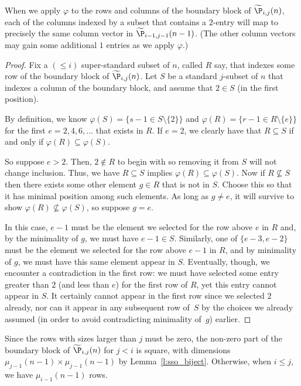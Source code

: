 \begin{lemma}\label{l:ssoequiv}
When we apply $\varphi$ to the rows and columns of the boundary block of $\widetilde\P_{i,j}(n)$, each of the columns indexed by a subset that contains a $2$-entry will map to precisely the same column vector in $\widetilde\P_{i-1,j-1}(n-1)$.  (The other column vectors may gain some additional $1$ entries as we apply $\varphi$.)
\end{lemma}
\begin{proof}
Fix a $(\leq i)$ super-standard subset of $n$, called $R$ say, that indexes some row of the boundary block of $\widetilde\P_{i,j}(n)$.  Let $S$ be a standard $j$-subset of $n$ that indexes a column of the boundary block, and assume that $2 \in S$ (in the first position).

By definition, we know $\varphi(S) = \{ s-1 \in S \setminus \{2\} \}$ and $\varphi(R) = \{ r-1 \in R \setminus \{e\} \}$ for the first $e = 2, 4, 6, \ldots$ that exists in $R$.  If $e = 2$, we clearly have that $R \subseteq S$ if and only if $\varphi(R) \subseteq \varphi(S)$.

So suppose $e > 2$.  Then, $2 \notin R$ to begin with so removing it from $S$ will not change inclusion.  Thus, we have $R \subseteq S$ implies $\varphi(R) \subseteq \varphi(S)$.  Now if $R \not \subseteq S$ then there exists some other element $g \in R$ that is not in $S$.  Choose this so that it has minimal position among such elements.  As long as $g \neq e$, it will survive to show $\varphi(R) \not \subseteq \varphi(S)$, so suppose $g = e$.

In this case, $e-1$ must be the element we selected for the row above $e$ in $R$ and, by the minimality of $g$, we must have $e-1 \in S$.  Similarly, one of $\{e-3, e-2\}$ must be the element we selected for the row above $e-1$ in $R$, and by minimality of $g$, we must have this same element appear in $S$.  Eventually, though, we encounter a contradiction in the first row:  we must have selected some entry greater than $2$ (and less than $e$) for the first row of $R$, yet this entry cannot appear in $S$.  It certainly cannot appear in the first row since we selected $2$ already, nor can it appear in any subsequent row of~$S$ by the choices we already assumed (in order to avoid contradicting minimality of~$g$) earlier.
\end{proof}

Since the rows with sizes larger than $j$ must be zero, the non-zero part of the boundary block of $\widetilde\P_{i,j}(n)$ for $j < i$ is square, with dimensions $\mu_{j-1}(n-1) \times \mu_{j-1}(n-1)$ by Lemma~\ref{l:sso_biject}.  Otherwise, when $i \leq j$, we have $\mu_{i-1}(n-1)$ rows.


